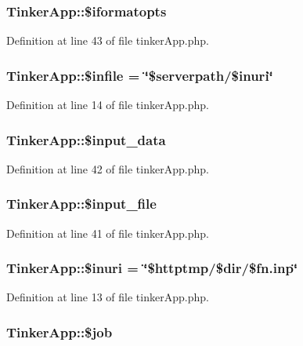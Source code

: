 \subsubsection{\setlength{\rightskip}{0pt plus 5cm}Tinker\-App::\$iformatopts}\label{classTinkerApp_o18}




Definition at line 43 of file tinker\-App.php.
\subsubsection{\setlength{\rightskip}{0pt plus 5cm}Tinker\-App::\$infile = \char`\"{}\$serverpath/\$inuri\char`\"{}}\label{classTinkerApp_o3}




Definition at line 14 of file tinker\-App.php.
\subsubsection{\setlength{\rightskip}{0pt plus 5cm}Tinker\-App::\$input\_\-data}\label{classTinkerApp_o17}




Definition at line 42 of file tinker\-App.php.
\subsubsection{\setlength{\rightskip}{0pt plus 5cm}Tinker\-App::\$input\_\-file}\label{classTinkerApp_o16}




Definition at line 41 of file tinker\-App.php.
\subsubsection{\setlength{\rightskip}{0pt plus 5cm}Tinker\-App::\$inuri = \char`\"{}\$httptmp/\$dir/\$fn.inp\char`\"{}}\label{classTinkerApp_o2}




Definition at line 13 of file tinker\-App.php.
\subsubsection{\setlength{\rightskip}{0pt plus 5cm}Tinker\-App::\$job}\label{classTinkerApp_o23}




